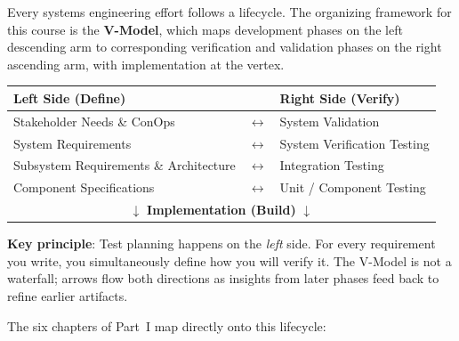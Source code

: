 \documentclass[11pt,letterpaper,twoside,openany]{book}
\begin{document}
Every systems engineering effort follows a lifecycle. The organizing framework for this course is the \textbf{V-Model}, which maps development phases on the left descending arm to corresponding verification and validation phases on the right ascending arm, with implementation at the vertex.

\begin{keyconceptbox}
\begin{center}
\begin{tabular}{lcl}
\textbf{Left Side (Define)} & & \textbf{Right Side (Verify)} \\
\midrule
Stakeholder Needs \& ConOps & $\longleftrightarrow$ & System Validation \\
System Requirements & $\longleftrightarrow$ & System Verification Testing \\
Subsystem Requirements \& Architecture & $\longleftrightarrow$ & Integration Testing \\
Component Specifications & $\longleftrightarrow$ & Unit / Component Testing \\
\multicolumn{3}{c}{$\downarrow$ \textbf{Implementation (Build)} $\downarrow$} \\
\end{tabular}
\end{center}
\textbf{Key principle}: Test planning happens on the \emph{left} side. For every requirement you write, you simultaneously define how you will verify it. The V-Model is not a waterfall; arrows flow both directions as insights from later phases feed back to refine earlier artifacts.
\end{keyconceptbox}

The six chapters of Part~I map directly onto this lifecycle:
\end{document}
